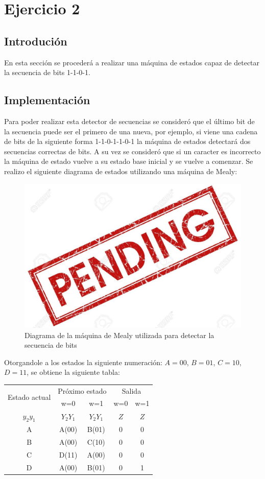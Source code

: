 
\usepackage{multirow}


\section{Ejercicio 2}
\subsection{Introdución}
En esta sección se procederá a realizar una máquina de estados capaz de detectar la secuencia de bits 1-1-0-1.

\subsection{Implementación} 
Para poder realizar esta detector de secuencias se consideró que el último bit de la secuencia puede ser el primero de una nueva, por ejemplo, si viene una cadena de bits de la siguiente forma 1-1-0-1-1-0-1 la máquina de estados detectará dos secuencias correctas de bits. A su vez se consideró que si un caracter es incorrecto la máquina de estado vuelve a su estado base inicial y se vuelve a comenzar. Se realizo el siguiente diagrama de estados utilizando una máquina de Mealy:
\begin{figure}[H]
\centering
\includegraphics{ImagenesEjercicio2/pend.jpg}
\caption{Diagrama de la máquina de Mealy utilizada para detectar la secuencia de bits}
\end{figure}


Otorgandole a los estados la siguiente numeración: $A=00$, $B=01$, $C=10$, $D=11$, se obtiene la siguiente tabla:

\begin{table}[H]
\centering
\begin{tabular}{ccccc}
\multirow{2}{*}{Estado actual} & \multicolumn{2}{c}{Próximo estado} & \multicolumn{2}{c}{Salida} \\
 & w=0 & w=1 & w=0 & w=1 \\
$y_2y_1$ & $Y_2Y_1$ & $Y_2Y_1$ & $Z$ & $Z$ \\
A & A(00) & B(01) & 0 & 0 \\
B & A(00) & C(10) & 0 & 0 \\
C & D(11) & A(00) & 0 & 0 \\
D & A(00) & B(01) & 0 & 1
\end{tabular}
\end{table}

